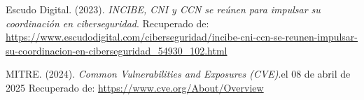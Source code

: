 \documentclass[a4paper, 10pt]{article}
\begin{document}
\begin{thebibliography}{20}
    Escudo Digital. (2023). \textit{INCIBE, CNI y CCN se reúnen para impulsar su coordinación en ciberseguridad}. Recuperado de: \url{https://www.escudodigital.com/ciberseguridad/incibe-cni-ccn-se-reunen-impulsar-su-coordinacion-en-ciberseguridad_54930_102.html}
    
    MITRE. (2024). \textit{Common Vulnerabilities and Exposures (CVE)}.el 08 de abril de 2025  Recuperado de: \url{https://www.cve.org/About/Overview}
    

\end{thebibliography}


\clearpage
\end{document}

